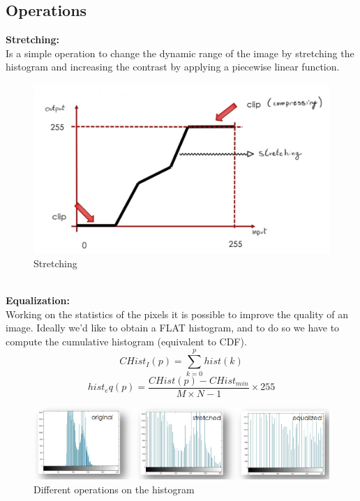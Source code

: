 \subsection{Operations}

\textbf{Stretching:}
\\Is a simple operation to change the dynamic range of the image by stretching the histogram and increasing the contrast by applying a piecewise linear function. 
\begin{figure}[h]
    \centering
    \includegraphics[scale=0.3]{Figures/Stretching.jpeg}
    \caption{Stretching}
    \label{fig:enter-label}
\end{figure}   
\\ 
\textbf{Equalization:}
\\Working on the statistics of the pixels it is possible to improve the quality of an image. Ideally we’d like to obtain a FLAT histogram, and to do so we have to compute the cumulative histogram (equivalent to CDF).
    \[
        CHist_I(p) = \sum_{k=0}^{p} hist(k)
    \]
    \[
        hist_eq(p) = \frac{CHist(p)-CHist_{min}}{M \times N-1}\times 255
    \]
\begin{figure}[h]
    \centering
    \includegraphics[scale=0.5]{Figures/OperationsHist.png}
    \caption{Different operations on the histogram}
    \label{fig:enter-label}
\end{figure}
    
